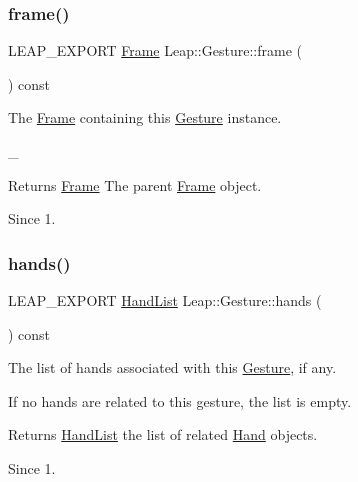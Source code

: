 \subsubsection{\texorpdfstring{frame()}{frame()}}
{\footnotesize\ttfamily L\+E\+A\+P\+\_\+\+E\+X\+P\+O\+RT \hyperlink{class_leap_1_1_frame}{Frame} Leap\+::\+Gesture\+::frame (\begin{DoxyParamCaption}{ }\end{DoxyParamCaption}) const}

The \hyperlink{class_leap_1_1_frame}{Frame} containing this \hyperlink{class_leap_1_1_gesture}{Gesture} instance.


\begin{DoxyCodeInclude}
\end{DoxyCodeInclude}
 \+\_\+ \begin{DoxyReturn}{Returns}
\hyperlink{class_leap_1_1_frame}{Frame} The parent \hyperlink{class_leap_1_1_frame}{Frame} object. 
\end{DoxyReturn}
\begin{DoxySince}{Since}
1. 
\end{DoxySince}
\mbox{\label{class_leap_1_1_gesture_a90bd43eed969a8e93d6ef174132b70dd}} 
\subsubsection{\texorpdfstring{hands()}{hands()}}
{\footnotesize\ttfamily L\+E\+A\+P\+\_\+\+E\+X\+P\+O\+RT \hyperlink{class_leap_1_1_hand_list}{Hand\+List} Leap\+::\+Gesture\+::hands (\begin{DoxyParamCaption}{ }\end{DoxyParamCaption}) const}

The list of hands associated with this \hyperlink{class_leap_1_1_gesture}{Gesture}, if any.


\begin{DoxyCodeInclude}
\end{DoxyCodeInclude}


If no hands are related to this gesture, the list is empty.

\begin{DoxyReturn}{Returns}
\hyperlink{class_leap_1_1_hand_list}{Hand\+List} the list of related \hyperlink{class_leap_1_1_hand}{Hand} objects. 
\end{DoxyReturn}
\begin{DoxySince}{Since}
1. 
\end{DoxySince}
\mbox{\label{class_leap_1_1_gesture_ac5fdf7f34e05b0a771ee3084610e9c26}} 
